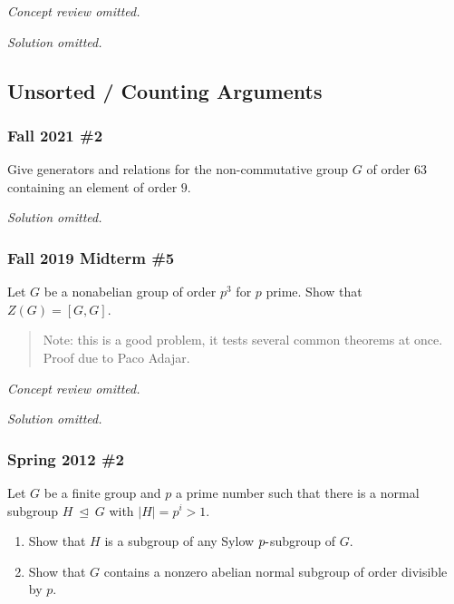 \emph{Concept review omitted.}

\emph{Solution omitted.}

\hypertarget{unsorted-counting-arguments}{%
\subsection{Unsorted / Counting
Arguments}\label{unsorted-counting-arguments}}

\hypertarget{fall-2021-2}{%
\subsubsection{Fall 2021 \#2}\label{fall-2021-2}}

Give generators and relations for the non-commutative group \(G\) of
order 63 containing an element of order \(9 .\)

\emph{Solution omitted.}

\hypertarget{fall-2019-midterm-5}{%
\subsubsection{Fall 2019 Midterm \#5}\label{fall-2019-midterm-5}}

Let \(G\) be a nonabelian group of order \(p^3\) for \(p\) prime. Show
that \(Z(G) = [G, G]\).

\begin{quote}
Note: this is a good problem, it tests several common theorems at once.
Proof due to Paco Adajar.
\end{quote}

\emph{Concept review omitted.}

\emph{Solution omitted.}

\hypertarget{spring-2012-2}{%
\subsubsection{Spring 2012 \#2}\label{spring-2012-2}}

Let \(G\) be a finite group and \(p\) a prime number such that there is
a normal subgroup \(H{~\trianglelefteq~}G\) with
\({\left\lvert {H} \right\rvert} = p^i > 1\).

\begin{enumerate}
\def\labelenumi{\alph{enumi}.}
\item
  Show that \(H\) is a subgroup of any Sylow \(p{\hbox{-}}\)subgroup of
  \(G\).
\item
  Show that \(G\) contains a nonzero abelian normal subgroup of order
  divisible by \(p\).
\end{enumerate}

